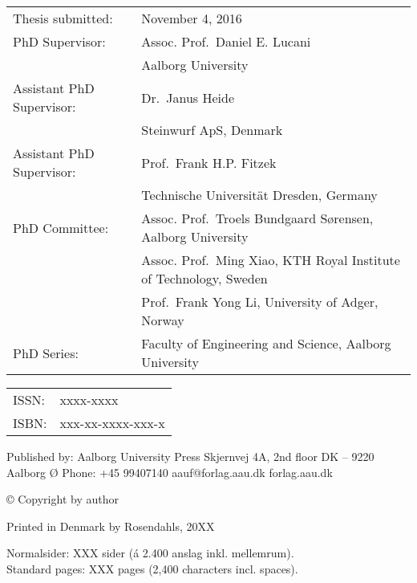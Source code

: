 \thispagestyle{empty}
\noindent
\begin{tabularx}{\textwidth}{@{}lX}
    Thesis submitted: & November 4, 2016\\
    PhD Supervisor: & Assoc. Prof.\ Daniel E. Lucani\\
                    & Aalborg University\\
    Assistant PhD Supervisor: & Dr.\ Janus Heide\\
                    & Steinwurf ApS, Denmark\\
    Assistant PhD Supervisor: & Prof.\ Frank H.P. Fitzek\\
                    & Technische Universit\"{a}t Dresden, Germany\\
    PhD Committee: & Assoc. Prof.\ Troels Bundgaard S\o rensen, Aalborg University\\
                   & Assoc. Prof.\ Ming Xiao, KTH Royal Institute of Technology, Sweden\\
                   & Prof.\ Frank Yong Li, University of Adger, Norway\\
    PhD Series:    & Faculty of Engineering and Science, Aalborg University\\
\end{tabularx}
\strut\vfill
\noindent
\begin{tabularx}{\textwidth}{@{}lX}
    ISSN: & xxxx-xxxx\\
    ISBN: & xxx-xx-xxxx-xxx-x\\
\end{tabularx}
\strut\vfill
\noindent Published by:\newline
Aalborg University Press\newline
Skjernvej 4A, 2nd floor\newline
DK – 9220 Aalborg Ø\newline
Phone: +45 99407140\newline
aauf@forlag.aau.dk\newline
forlag.aau.dk
\strut\vfill
\noindent \copyright{} Copyright by author\newline
\strut\vfill
\noindent Printed in Denmark by Rosendahls, 20XX
\strut\vfill\vfill\vfill
\noindent Normalsider: XXX sider (á 2.400 anslag inkl. mellemrum).\\
Standard pages: XXX pages (2,400 characters incl. spaces).
\clearpage

